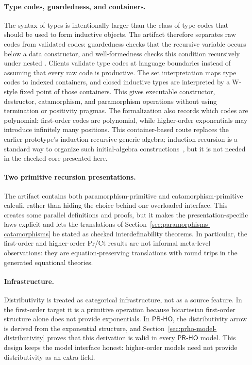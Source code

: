 \documentclass[sigplan,10pt,anonymous,review,screen]{acmart}
\newcommand{\PRHO}{\ensuremath{\mathsf{PR\mbox{-}HO}}}
\begin{document}
\paragraph{Type codes, guardedness, and containers.}
The syntax of types is intentionally larger than the class of type codes
that should be used to form inductive objects.  The artifact therefore
separates raw  codes from validated codes: guardedness
checks that the recursive variable occurs below a data constructor, and
well-formedness checks this condition recursively under nested
.  Clients validate type codes at language
boundaries instead of assuming that every raw code is productive.  The
set interpretation maps type codes to indexed containers, and closed
inductive types are interpreted by a W-style fixed point of those
containers.  This gives executable constructor, destructor, catamorphism, and paramorphism
operations without using termination or positivity pragmas.  The
formalization also records which codes are polynomial: first-order codes
are polynomial, while higher-order exponentials may introduce infinitely
many positions.  This container-based route replaces the earlier
prototype's induction-recursive generic algebra; induction-recursion is
a standard way to organize such initial-algebra
constructions~\cite{DBLP:journals/apal/DybjerS03}, but it is not needed
in the checked core presented here.

\paragraph{Two primitive recursion presentations.}
The artifact contains both paramorphism-primitive and catamorphism-primitive
calculi, rather than hiding the choice behind one overloaded interface.
This creates some parallel definitions and proofs, but it makes the
presentation-specific laws explicit and lets the translations of
Section~\ref{sec:paramorphisms-catamorphisms} be stated as checked
interdefinability theorems.  In particular, the first-order and
higher-order Pr/Ct results are not informal meta-level observations: they
are equation-preserving translations with round trips in the generated
equational theories.

\paragraph{Infrastructure.}
Distributivity is treated as categorical infrastructure, not as a source
feature.  In the first-order target it is a
primitive operation because bicartesian first-order structure alone does
not provide exponentials.  In \PRHO{}, the distributivity arrow is
derived from the exponential structure, and
Section~\ref{sec:prho-model-distributivity} proves that this derivation
is valid in every \PRHO{} model.  This design keeps the model interface
honest: higher-order models need not provide distributivity as an extra
field.
\end{document}
